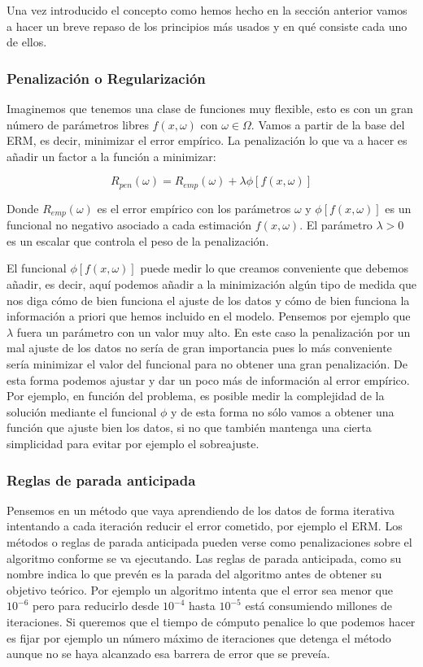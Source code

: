 Una vez introducido el concepto como hemos hecho en la sección anterior vamos a hacer un breve repaso de los principios más usados y en qué consiste cada uno de ellos.

\subsubsection{Penalización o Regularización}

Imaginemos que tenemos una clase de funciones muy flexible, esto es con un gran número de parámetros libres $f(x,\omega)$ con $\omega \in \Omega$. Vamos a partir de la base del ERM, es decir, minimizar el error empírico. La penalización lo que va a hacer es añadir un factor a la función a minimizar:

$$R_{pen}(\omega) = R_{emp}(\omega) + \lambda \phi [f(x,\omega)]$$

Donde $R_{emp}(\omega)$ es el error empírico con los parámetros $\omega$ y $\phi [f(x,\omega)]$ es un funcional no negativo asociado a cada estimación $f(x,\omega)$. El parámetro $\lambda >0$ es un escalar que controla el peso de la penalización.

El funcional $\phi [f(x,\omega)]$ puede medir lo que creamos conveniente que debemos añadir, es decir, aquí podemos añadir a la minimización algún tipo de medida que nos diga cómo de bien funciona el ajuste de los datos y cómo de bien funciona la información a priori que hemos incluido en el modelo. Pensemos por ejemplo que $\lambda$ fuera un parámetro con un valor muy alto. En este caso la penalización por un mal ajuste de los datos no sería de gran importancia pues lo más conveniente sería minimizar el valor del funcional para no obtener una gran penalización. De esta forma podemos ajustar y dar un poco más de información al error empírico. Por ejemplo, en función del problema, es posible medir la complejidad de la solución mediante el funcional $\phi$ y de esta forma no sólo vamos a obtener una función que ajuste bien los datos, si no que también mantenga una cierta simplicidad para evitar por ejemplo el sobreajuste.

\subsubsection{Reglas de parada anticipada}

Pensemos en un método que vaya aprendiendo de los datos de forma iterativa intentando a cada iteración reducir el error cometido, por ejemplo el ERM. Los métodos o reglas de parada anticipada pueden verse como penalizaciones sobre el algoritmo conforme se va ejecutando. Las reglas de parada anticipada, como su nombre indica lo que prevén es la parada del algoritmo antes de obtener su objetivo teórico. Por ejemplo un algoritmo intenta que el error sea menor que $10^{-6}$ pero para reducirlo desde $10^{-4}$ hasta $10^{-5}$ está consumiendo millones de iteraciones. Si queremos que el tiempo de cómputo penalice lo que podemos hacer es fijar por ejemplo un número máximo de iteraciones que detenga el método aunque no se haya alcanzado esa barrera de error que se preveía.

